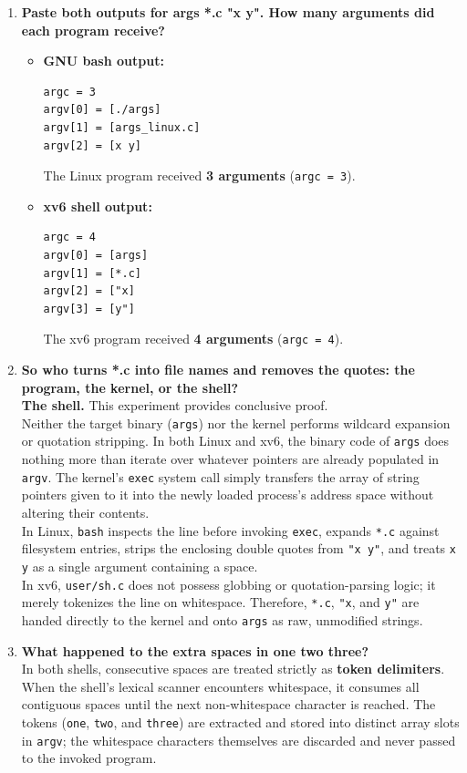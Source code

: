 \documentclass{labreport}
\begin{document}
\begin{enumerate}[leftmargin=*]
    \item \textbf{Paste both outputs for args *.c "x y". How many arguments did each program receive?}
    \begin{itemize}[noitemsep, topsep=2pt]
        \item \textbf{GNU bash output:}
\begin{lstlisting}[style=bash]
argc = 3
argv[0] = [./args]
argv[1] = [args_linux.c]
argv[2] = [x y]
\end{lstlisting}
        The Linux program received \textbf{3 arguments} (\texttt{argc = 3}).
        \item \textbf{xv6 shell output:}
\begin{lstlisting}[style=bash]
argc = 4
argv[0] = [args]
argv[1] = [*.c]
argv[2] = ["x]
argv[3] = [y"]
\end{lstlisting}
        The xv6 program received \textbf{4 arguments} (\texttt{argc = 4}).
    \end{itemize}

    \item \textbf{So who turns *.c into file names and removes the quotes: the program, the kernel, or the shell?}\\[0.2em]
    \textbf{The shell.} This experiment provides conclusive proof.\\
    Neither the target binary (\texttt{args}) nor the kernel performs wildcard expansion or quotation stripping. In both Linux and xv6, the binary code of \texttt{args} does nothing more than iterate over whatever pointers are already populated in \texttt{argv}. The kernel's \texttt{exec} system call simply transfers the array of string pointers given to it into the newly loaded process's address space without altering their contents.\\
    In Linux, \texttt{bash} inspects the line before invoking \texttt{exec}, expands \texttt{*.c} against filesystem entries, strips the enclosing double quotes from \texttt{"x y"}, and treats \texttt{x y} as a single argument containing a space.\\
    In xv6, \texttt{user/sh.c} does not possess globbing or quotation-parsing logic; it merely tokenizes the line on whitespace. Therefore, \texttt{*.c}, \texttt{"x}, and \texttt{y"} are handed directly to the kernel and onto \texttt{args} as raw, unmodified strings.

    \item \textbf{What happened to the extra spaces in one    two    three?}\\[0.2em]
    In both shells, consecutive spaces are treated strictly as \textbf{token delimiters}. When the shell's lexical scanner encounters whitespace, it consumes all contiguous spaces until the next non-whitespace character is reached. The tokens (\texttt{one}, \texttt{two}, and \texttt{three}) are extracted and stored into distinct array slots in \texttt{argv}; the whitespace characters themselves are discarded and never passed to the invoked program.
\end{enumerate}
\end{document}
